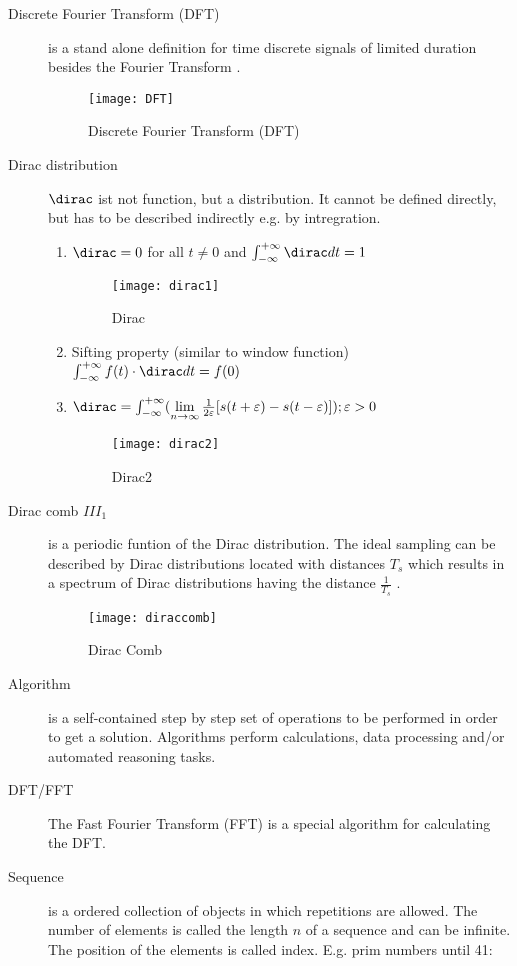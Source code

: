 \begin{description}
	\item[Discrete Fourier Transform (DFT)] is a stand alone definition for time discrete signals of limited duration besides the Fourier Transform .
		\begin{figure}[!h]
			\centering
			\texttt{[image: DFT]}
			\caption[Discrete Fourier Transform (DFT)]{Discrete Fourier Transform (DFT)}
			\label{fig:DFT}
		\end{figure}
	\item[Dirac distribution] $\dirac$ ist not function, but a distribution. It cannot be defined directly, but has to be described indirectly e.g. by intregration.
		\begin{enumerate}
			\item $ \dirac=0$ for all $t\neq0$ and $\int_{-\infty}^{+\infty}\dirac dt = 1 $
				\begin{figure}[!h]
					\centering
					\texttt{[image: dirac1]}
					\caption{Dirac}
					\label{fig:dirac1}
				\end{figure}
			\item Sifting property (similar to window function)
			$\int_{-\infty}^{+\infty} f(t) \cdot \dirac dt = f(0) $
			\item $\dirac = \int_{-\infty}^{+\infty}(\lim\limits_{n \to \infty} \frac{1}{2\varepsilon}[s(t+\varepsilon)-s(t-\varepsilon)] ); \varepsilon>0 $
				\begin{figure}[!h]
					\centering
					\texttt{[image: dirac2]}
					\caption{Dirac2}
					\label{fig:dirac2}
				\end{figure}				
		\end{enumerate}
	\item[Dirac comb ${III}_1$] is a periodic funtion of the Dirac distribution. The ideal sampling can be described by Dirac distributions located with distances $T_s$ which results in a spectrum of Dirac distributions having the distance $\frac{1}{T_s}$ .
		\begin{figure}[!h]
			\centering
			\texttt{[image: diraccomb]}
			\caption{Dirac Comb}
			\label{fig:diraccomb}
		\end{figure}
	\item[Algorithm] is a self-contained step by step set of operations to be performed in order to get a solution. Algorithms perform calculations, data processing and/or automated reasoning tasks.
	\item[DFT/FFT] The Fast Fourier Transform (FFT) is a special algorithm for calculating the DFT.
	\item[Sequence] is a ordered collection of objects in which repetitions are allowed. The number of elements is called the length $n$ of a sequence and can be infinite. The position of the elements is called index.
	E.g. prim numbers until 41: 
	

\end{description}
